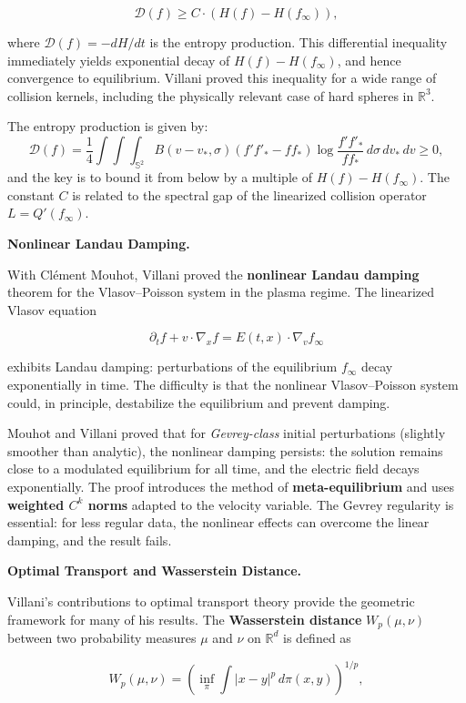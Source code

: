 \[
\mathcal{D}(f) \geq C \cdot (H(f) - H(f_\infty)),
\]

where $\mathcal{D}(f) = -dH/dt$ is the entropy production. This differential inequality immediately yields exponential decay of $H(f) - H(f_\infty)$, and hence convergence to equilibrium. Villani proved this inequality for a wide range of collision kernels, including the physically relevant case of hard spheres in $\mathbb{R}^3$.

The entropy production is given by:
\[
\mathcal{D}(f) = \frac{1}{4} \int \int \int_{\mathbb{S}^2} B(v-v_*, \sigma) (f' f'_* - f f_*) \log \frac{f' f'_*}{f f_*} \, d\sigma \, dv_* \, dv \ge 0,
\]
and the key is to bound it from below by a multiple of $H(f) - H(f_\infty)$. The constant $C$ is related to the spectral gap of the linearized collision operator $L = Q'(f_\infty)$.

\textbf{Nonlinear Landau Damping.}

With Clément Mouhot, Villani proved the \textbf{nonlinear Landau damping} theorem for the Vlasov--Poisson system in the plasma regime. The linearized Vlasov equation

\[
\partial_t f + v \cdot \nabla_x f = E(t,x) \cdot \nabla_v f_\infty
\]

exhibits Landau damping: perturbations of the equilibrium $f_\infty$ decay exponentially in time. The difficulty is that the nonlinear Vlasov--Poisson system could, in principle, destabilize the equilibrium and prevent damping.

Mouhot and Villani proved that for \emph{Gevrey-class} initial perturbations (slightly smoother than analytic), the nonlinear damping persists: the solution remains close to a modulated equilibrium for all time, and the electric field decays exponentially. The proof introduces the method of \textbf{meta-equilibrium} and uses \textbf{weighted $C^k$ norms} adapted to the velocity variable. The Gevrey regularity is essential: for less regular data, the nonlinear effects can overcome the linear damping, and the result fails.

\textbf{Optimal Transport and Wasserstein Distance.}

Villani's contributions to optimal transport theory provide the geometric framework for many of his results. The \textbf{Wasserstein distance} $W_p(\mu,\nu)$ between two probability measures $\mu$ and $\nu$ on $\mathbb{R}^d$ is defined as

\[
W_p(\mu,\nu) = \left( \inf_{\pi} \int |x-y|^p \, d\pi(x,y) \right)^{1/p},
\]

